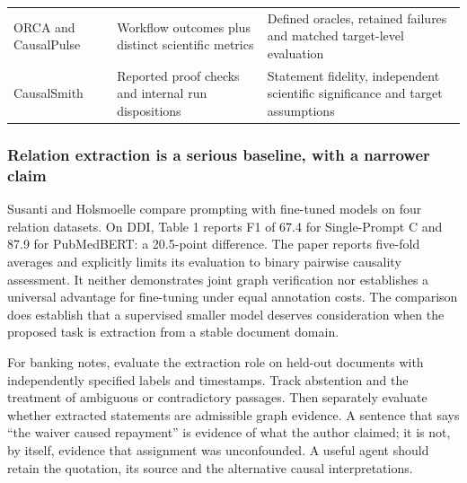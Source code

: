 \begin{longtable}[]{@{}lll@{}}
\begin{minipage}[t]{0.30\columnwidth}
ORCA and CausalPulse\strut
\end{minipage} & \begin{minipage}[t]{0.30\columnwidth}\raggedright
Workflow outcomes plus distinct scientific metrics\strut
\end{minipage} & \begin{minipage}[t]{0.30\columnwidth}\raggedright
Defined oracles, retained failures and matched target-level
evaluation\strut
\end{minipage}\tabularnewline
\begin{minipage}[t]{0.30\columnwidth}\raggedright
CausalSmith\strut
\end{minipage} & \begin{minipage}[t]{0.30\columnwidth}\raggedright
Reported proof checks and internal run dispositions\strut
\end{minipage} & \begin{minipage}[t]{0.30\columnwidth}\raggedright
Statement fidelity, independent scientific significance and target
assumptions\strut
\end{minipage}\tabularnewline
\bottomrule
\end{longtable}

\hypertarget{relation-extraction-is-a-serious-baseline-with-a-narrower-claim}{%
\subsubsection{Relation extraction is a serious baseline, with a
narrower
claim}\label{relation-extraction-is-a-serious-baseline-with-a-narrower-claim}}

Susanti and Holsmoelle compare prompting with fine-tuned models on four
relation datasets. On DDI, Table 1 reports F1 of 67.4 for Single-Prompt
C and 87.9 for PubMedBERT: a 20.5-point difference. The paper reports
five-fold averages and explicitly limits its evaluation to binary
pairwise causality assessment. It neither demonstrates joint graph
verification nor establishes a universal advantage for fine-tuning under
equal annotation costs. The comparison does establish that a supervised
smaller model deserves consideration when the proposed task is
extraction from a stable document domain.
\cite{exec13_census_graph_validation}

For banking notes, evaluate the extraction role on held-out documents
with independently specified labels and timestamps. Track abstention and
the treatment of ambiguous or contradictory passages. Then separately
evaluate whether extracted statements are admissible graph evidence. A
sentence that says ``the waiver caused repayment'' is evidence of what
the author claimed; it is not, by itself, evidence that assignment was
unconfounded. A useful agent should retain the quotation, its source and
the alternative causal interpretations.


